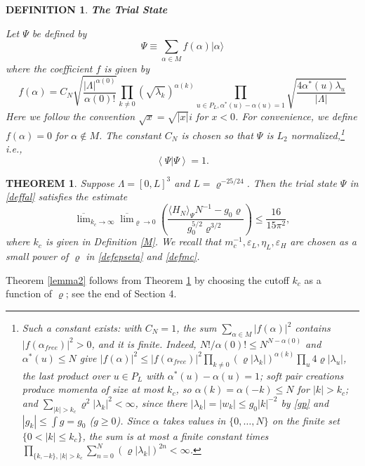 \documentclass[11pt]{article}
\numberwithin{equation}{section}
\newcommand{\e}{\varepsilon}
\newcommand{\beq}{\begin{equation}}
\newcommand{\eeq}{\end{equation}}
\newcommand\al{{\alpha}}
\renewcommand\rho\varrho
\newtheorem{thm}{THEOREM}[section]
\newtheorem{mydef}{DEFINITION}[section]
\theoremstyle{definition}
\begin{document}
\begin{mydef}{\bf The Trial State}
\par Let  $\Psi$ be defined by 
\beq
\Psi\equiv\sum_{\al\in M}f(\al)|\al\rangle
\eeq
where the coefficient $f$ is given by 
 \beq\label{deffal}
f(\al)=C_N %
\sqrt { \frac  {|\Lambda|^{\alpha(0)}} {\al(0)!} }\prod_{k\neq 0}(\sqrt{\lambda_{k}})^{\al(k)}\prod_{u\in P_L, \alpha^\ast (u) - \alpha (u) = 1}\sqrt{\frac{4\al^*(u)\lambda_u}{|\Lambda|}}
\eeq
Here we follow the convention $\sqrt{x}=\sqrt{|x|}i$ for $x<0$. For convenience, we define $f(\al)=0$ for $\al\notin M$.
The constant  $C_N$ is  chosen so that $\Psi$ is $L_2$ normalized,\footnote{Such a constant exists: with $C_N=1$,
the sum $\sum_{\al\in M}|f(\al)|^2$ contains $|f(\al_{free})|^2>0$, and it is finite. Indeed,
$N!/\al(0)!\le N^{N-\al(0)}$ and $\al^*(u)\le N$ give
$|f(\al)|^2\le |f(\al_{free})|^2\prod_{k\neq 0}(\rho|\lambda_k|)^{\al(k)}\prod_u 4\rho|\lambda_u|$, the last product
over $u\in P_L$ with $\al^*(u)-\al(u)=1$; soft pair creations produce momenta of size at most $k_c$, so
$\al(k)=\al(-k)\le N$ for $|k|>k_c$; and $\sum_{|k|>k_c}\rho^2|\lambda_k|^2<\infty$, since there
$|\lambda_k|=|w_k|\le g_0|k|^{-2}$ by \eqref{gp} and $|g_k|\le\int g=g_0$ ($g\ge0$). Since $\al$ takes
values in $\{0,\ldots,N\}$ on the finite set $\{0<|k|\le k_c\}$, the sum is at most a finite constant times
$\prod_{\{k,-k\},\,|k|>k_c}\sum_{n=0}^{N}(\rho|\lambda_k|)^{2n}<\infty$.} i.e.,
\[\left\langle \Psi|\Psi\right\rangle=1.\]  
\end{mydef}



\begin{thm}\label{lemma2.1} Suppose  $\Lambda = [ 0, L]^3$ and $L = \rho^{-25/24}$. 
Then the  trial state $\Psi$ in \eqref{deffal} satisfies the  estimate 
\beq
\overline\lim_{k_c \to \infty} \overline\lim_{\rho\to0}\left(
\frac{\langle H_N\rangle_\Psi N^{-1}-g_0\rho }{ g_0^{5/2}\rho^{3/2}}\right)\leq \frac{16}{15\pi^2},
\eeq
where $k_c$  is given in Definition \ref{M}. We recall that $m_c^{-1}, \e_L, \eta_L, \e_H$ are chosen as a small power of $\rho$ in \eqref{defepseta} and \eqref{defmc}.
\end{thm}
Theorem \ref{lemma2} follows from Theorem \ref{lemma2.1} by choosing the cutoff $k_c$ as a function of $\rho$;
see the end of Section 4.
\end{document}
